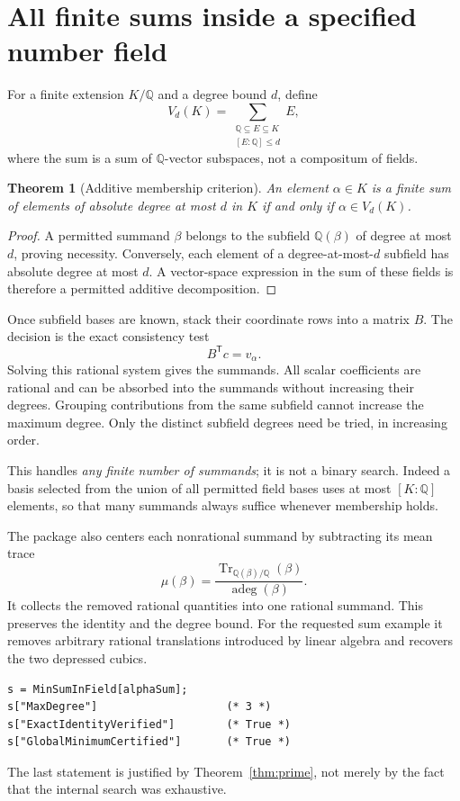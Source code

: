 \documentclass[11pt]{article}
\newcommand{\Q}{\mathbb Q}
\newcommand{\Tr}{\operatorname{Tr}}
\newcommand{\adeg}{\operatorname{adeg}}
\newtheorem{theorem}{Theorem}[section]
\theoremstyle{definition}\newtheorem{definition}[theorem]{Definition}
\theoremstyle{remark}\newtheorem{remark}[theorem]{Remark}
\begin{document}
\section{All finite sums inside a specified number field}
For a finite extension $K/\Q$ and a degree bound $d$, define
\[
 V_d(K)=\sum_{\substack{\Q\subseteq E\subseteq K\\{}[E:\Q]\le d}} E,
\]
where the sum is a sum of $\Q$-vector subspaces, not a compositum of fields.

\begin{theorem}[Additive membership criterion]\label{thm:additive}
An element $\alpha\in K$ is a finite sum of elements of absolute degree at
most $d$ in $K$ if and only if $\alpha\in V_d(K)$.
\end{theorem}
\begin{proof}
A permitted summand $\beta$ belongs to the subfield $\Q(\beta)$ of degree at
most $d$, proving necessity. Conversely, each element of a degree-at-most-$d$
subfield has absolute degree at most $d$. A vector-space expression in the
sum of these fields is therefore a permitted additive decomposition.
\end{proof}

Once subfield bases are known, stack their coordinate rows into a matrix $B$.
The decision is the exact consistency test
\[
 B^{\mathsf T}c=v_\alpha.
\]
Solving this rational system gives the summands. All scalar coefficients are
rational and can be absorbed into the summands without increasing their degrees.
Grouping contributions from the same subfield cannot increase the maximum degree.
Only the distinct subfield degrees need be tried, in increasing order.

This handles \emph{any finite number of summands}; it is not a binary search.
Indeed a basis selected from the union of all permitted field bases uses at most
$[K:\Q]$ elements, so that many summands always suffice whenever membership holds.

The package also centers each nonrational summand by subtracting its mean trace
\[
 \mu(\beta)=\frac{\Tr_{\Q(\beta)/\Q}(\beta)}{\adeg(\beta)}.
\]
It collects the removed rational quantities into one rational summand. This
preserves the identity and the degree bound. For the requested sum example it
removes arbitrary rational translations introduced by linear algebra and recovers
the two depressed cubics.
\begin{lstlisting}
s = MinSumInField[alphaSum];
s["MaxDegree"]                    (* 3 *)
s["ExactIdentityVerified"]        (* True *)
s["GlobalMinimumCertified"]       (* True *)
\end{lstlisting}
The last statement is justified by Theorem~\ref{thm:prime}, not merely by the
fact that the internal search was exhaustive.
\end{document}
